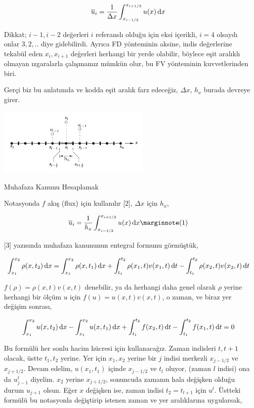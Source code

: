 \documentclass[12pt,fleqn]{article}\usepackage{../../common}
\begin{document}
$$
\overline{u}_i = \frac{1}{\Delta x} \int _{x_{i-1/2}}^{x_{i+1/2}} u(x) \,\mathrm{d} x
$$

Dikkat; $i-1,i-2$ değerleri $i$ referanslı olduğu için eksi içerikli, $i=4$
olsaydı onlar $3,2,..$ diye gidebilirdi. Ayrıca FD yönteminin aksine, indis
değerlerine tekabül eden $x_i,x_{i+1}$ değerleri herhangi bir yerde olabilir,
böylece eşit aralıklı olmayan ızgaralarla çalışmamız mümkün olur, bu FV
yönteminin kuvvetlerinden biri. 

Gerçi biz bu anlatımda ve kodda eşit aralık farz edeceğiz, $\Delta x$, $h_x$
burada devreye girer. 

\includegraphics[width=20em]{12-20-00.png}

Muhafaza Kanunu Hesaplamak

Notasyonda $f$ akış (flux) için kullanılır [2], $\Delta x$ için $h_x$,

$$
\overline{u}_i =  \frac{1}{h_x} \int_{x_{i-1/2}}^{x_{i+1/2}} u(x) \ud x
\mlabel{1}
$$

[3] yazısında muhafaza kanununun entegral formunu görmüştük,

$$
\int _{x_1}^{x_2} \rho(x,t_2) \,\mathrm{d} x =
\int _{x_1}^{x_2} \rho(x,t_1) \,\mathrm{d} x  +
\int_{t_1}^{t_2} \rho(x_1,t) v(x_1,t) \,\mathrm{d} t -
\int_{t_1}^{t_2}  \rho(x_2,t) v(x_2,t) \,\mathrm{d} t
$$

$f(\rho) = \rho(x,t) v(x,t)$ denebilir, ya da herhangi daha genel olarak $\rho$
yerine herhangi bir ölçüm $u$ için $f(u) = u(x,t) v(x,t)$, o zaman, ve
biraz yer değişim sonrası,

$$
\int_{x_1}^{x_2} u(x,t_2) \,\mathrm{d} x -
\int_{x_1}^{x_2} u(x,t_1) \,\mathrm{d} x  +
\int_{t_1}^{t_2} f(x_2,t) \,\mathrm{d} t  -
\int_{t_1}^{t_2} f(x_1,t) \,\mathrm{d} t = 0
$$

Bu formülü her sonlu hacim hücresi için kullanacağız. Zaman indisleri $t,t+1$
olacak, üstte $t_1,t_2$ yerine. Yer için $x_1,x_2$ yerine bir $j$ indisi
merkezli $x_{j-1/2}$ ve $x_{j+1/2}$. Devam edelim, $u(x_1,t_1)$ içinde
$x_{j-1/2}$ ve $t_l$ oluyor, (zaman $l$ indisi) ona da $u_{j-1}^l$
diyelim. $x_2$ yerine $x_{j+1/2}$, sonuncuda zamanın hala değişken olduğu durum
$u_{j+1}$ olsun. Eğer $x$ değişken ise, zaman indisi $t_2 = t_{l+1}$ için
$u^{l}$. Üstteki formülü bu notasyonla değiştirip istenen zaman ve yer
aralıklarına uygularsak,
\end{document}
